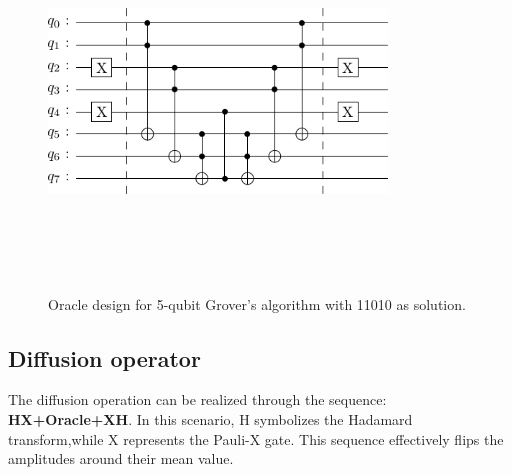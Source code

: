 \documentclass[conference]{IEEEtran}
\begin{document}
\begin{figure}[htbp]
	\centerline{\includegraphics[width=9cm,height=10cm,keepaspectratio]{5-qubit-11010.png}}
	\caption{Oracle design for 5-qubit Grover’s algorithm with 11010 as solution.}
	\label{fig7}
\end{figure}

\subsection{Diffusion operator}
The diffusion operation can be realized through the sequence: \textbf{HX+Oracle+XH}. In this scenario, H symbolizes
the Hadamard transform,while X represents the Pauli-X gate.
This sequence effectively flips the amplitudes around their
mean value.
\end{document}
